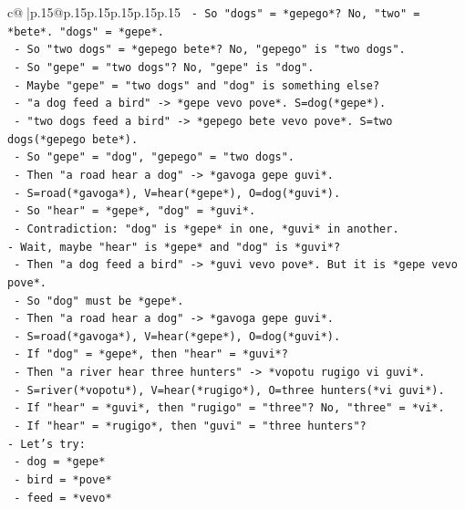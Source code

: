 \documentclass{article}
\begin{document}
{\begin{supertabular}{c@{$\;$}|p{.15\linewidth}@{}p{.15\linewidth}p{.15\linewidth}p{.15\linewidth}p{.15\linewidth}p{.15\linewidth}}
{{{\texttt{  {-} So "dogs" = *gepego*? No, "two" = *bete*. "dogs" = *gepe*.} \\
\texttt{  {-} So "two dogs" = *gepego bete*? No, "gepego" is "two dogs".} \\
\texttt{  {-} So "gepe" = "two dogs"? No, "gepe" is "dog".} \\
\texttt{  {-} Maybe "gepe" = "two dogs" and "dog" is something else?} \\
\texttt{  {-} "a dog feed a bird" {-}> *gepe vevo pove*. S=dog(*gepe*).} \\
\texttt{  {-} "two dogs feed a bird" {-}> *gepego bete vevo pove*. S=two dogs(*gepego bete*).} \\
\texttt{  {-} So "gepe" = "dog", "gepego" = "two dogs".} \\
\texttt{  {-} Then "a road hear a dog" {-}> *gavoga gepe guvi*.} \\
\texttt{    {-} S=road(*gavoga*), V=hear(*gepe*), O=dog(*guvi*).} \\
\texttt{    {-} So "hear" = *gepe*, "dog" = *guvi*.} \\
\texttt{    {-} Contradiction: "dog" is *gepe* in one, *guvi* in another.} \\
\texttt{{-} Wait, maybe "hear" is *gepe* and "dog" is *guvi*?} \\
\texttt{  {-} Then "a dog feed a bird" {-}> *guvi vevo pove*. But it is *gepe vevo pove*.} \\
\texttt{  {-} So "dog" must be *gepe*.} \\
\texttt{  {-} Then "a road hear a dog" {-}> *gavoga gepe guvi*.} \\
\texttt{    {-} S=road(*gavoga*), V=hear(*gepe*), O=dog(*guvi*).} \\
\texttt{    {-} If "dog" = *gepe*, then "hear" = *guvi*?} \\
\texttt{    {-} Then "a river hear three hunters" {-}> *vopotu rugigo vi guvi*.} \\
\texttt{      {-} S=river(*vopotu*), V=hear(*rugigo*), O=three hunters(*vi guvi*).} \\
\texttt{      {-} If "hear" = *guvi*, then "rugigo" = "three"? No, "three" = *vi*.} \\
\texttt{      {-} If "hear" = *rugigo*, then "guvi" = "three hunters"?} \\
\texttt{{-} Let's try:} \\
\texttt{  {-} dog = *gepe*} \\
\texttt{  {-} bird = *pove*} \\
\texttt{  {-} feed = *vevo*} \\
}}}
\end{supertabular}}
\end{document}
